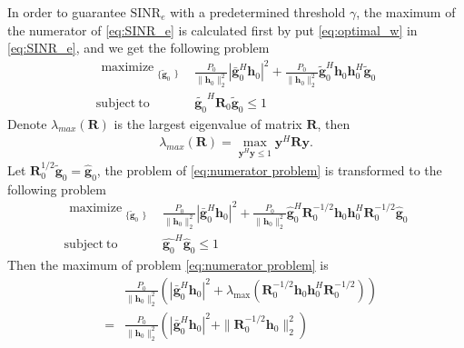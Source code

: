 \documentclass[conference]{IEEEtran}
\begin{document}
In order to guarantee $\mathrm{SINR}_e$ with a predetermined threshold $\gamma$, the maximum of the numerator of \eqref{eq:SINR_e} is calculated first by put \eqref{eq:optimal_w} in \eqref{eq:SINR_e}, and we get the following problem
\begin{equation}\label{eq:numerator problem}
\begin{array}{ll}
\begin{split}
\mathop{\text{maximize}}_{\substack{\{\tilde{\mathbf{g}}_{0}}\}} 
\end{split}  
& \frac{P_0}{\|\mathbf{h}_0\|_2^2}|\bar{\mathbf{g}}_0^H\mathbf{h}_0|^2 +\frac{P_0}{\|\mathbf{h}_0\|_2^2} \tilde{\mathbf{g}}_0^H\mathbf{h}_0\mathbf{h}_0^H\tilde{\mathbf{g}}_0\\
\mathrm{subject~to} &\tilde{\mathbf{g}_0}^H\mathbf{R}_0\tilde{\mathbf{g}}_0 \leq 1
\end{array}
\end{equation}
Denote $\lambda_{max}(\mathbf{R})$ is the largest eigenvalue of matrix $\mathbf{R}$, then
\begin{eqnarray}
\lambda_{max}(\mathbf{R})= \max_{\mathbf{y}^H\mathbf{y} \leq 1} \mathbf{y}^H\mathbf{R}\mathbf{y}.
\end{eqnarray}
Let $\mathbf{R}_0^{1/2}\tilde{\mathbf{g}}_0 = \hat{\mathbf{g}}_0$, the problem of \eqref{eq:numerator problem} is transformed to the following problem
\begin{equation}\label{eq:numerator problem1}
\begin{array}{ll}
\begin{split}
\mathop{\text{maximize}}_{\substack{\{\tilde{\mathbf{g}}_{0}}\}} 
\end{split}  
& \frac{P_0}{\|\mathbf{h}_0\|_2^2}|\bar{\mathbf{g}}_0^H\mathbf{h}_0|^2 +\frac{P_0}{\|\mathbf{h}_0\|_2^2} \hat{\mathbf{g}}_0^H\mathbf{R}_0^{-1/2}\mathbf{h}_0\mathbf{h}_0^H\mathbf{R}_0^{-1/2}\hat{\mathbf{g}}_0\\
\mathrm{subject~to} &\hat{\mathbf{g}_0}^H\hat{\mathbf{g}}_0 \leq 1
\end{array}
\end{equation}
Then the maximum of problem \eqref{eq:numerator problem} is
\begin{eqnarray}
&&\frac{P_0}{\|\mathbf{h}_0\|_2^2}(|\bar{\mathbf{g}}_0^H\mathbf{h}_0|^2 + \lambda_{\mathrm{max}}(\mathbf{R}_0^{-1/2}\mathbf{h}_0\mathbf{h}_0^H\mathbf{R}_0^{-1/2}))\\
&=&\frac{P_0}{\|\mathbf{h}_0\|_2^2}(|\bar{\mathbf{g}}_0^H\mathbf{h}_0|^2 + \|\mathbf{R}_0^{-1/2}\mathbf{h}_0\|_2^2)\label{eq:eigen_norm}
\end{eqnarray} 
\end{document}
